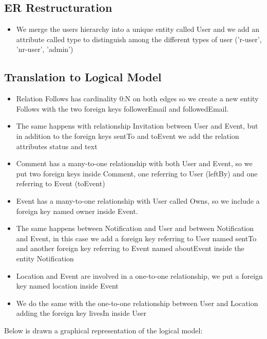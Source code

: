 \documentclass[12pt]{book}
\begin{document}
\subsection{ER Restructuration}
\begin{itemize}
\item{We merge the users hierarchy into a unique entity called User and we add an attribute called type to distinguish among the different types of user ('r-user', 'nr-user', 'admin')}
\end{itemize}
\subsection{Translation to Logical Model}
\begin{itemize}
\item{Relation Follows has cardinality 0:N on both edges so we create a new entity Follows with the two foreign keys followerEmail and followedEmail.}
\item{The same happens with relationship Invitation between User and Event, but in addition to the foreign keys sentTo and toEvent we add the relation attributes status and text}
\item{Comment has a many-to-one relationship with both User and Event, so we put two foreign keys inside Comment, one referring to User (leftBy) and one referring to Event (toEvent)}
\item{Event has a many-to-one relationship with User called Owns, so we include a foreign key named owner inside Event.}
\item{The same happens between Notification and User and between Notification and Event, in this case we add a foreign key referring to User named sentTo and another foreign key referring to Event named aboutEvent inside the entity Notification}
\item{Location  and Event are involved in a one-to-one relationship, we put a foreign key named location inside Event}
\item{We do the same with the one-to-one relationship between User and Location adding the foreign key livesIn inside User}
\end{itemize}

Below is drawn a graphical representation of the logical model:\\
\end{document}
